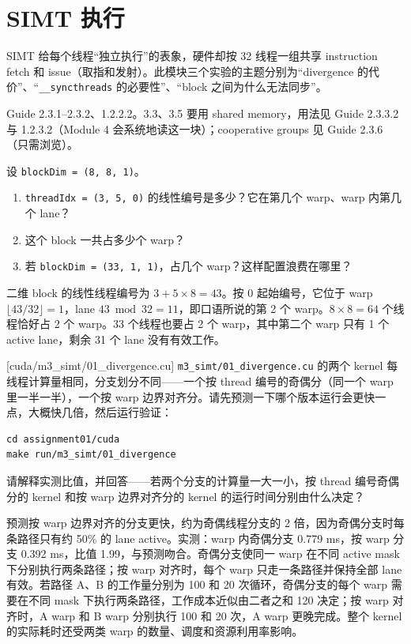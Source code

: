 \documentclass[11pt,a4paper,fontset=none]{ctexart}
\begin{document}
\section{SIMT 执行}

SIMT 给每个线程“独立执行”的表象，硬件却按 32 线程一组共享 instruction fetch 和 issue（取指和发射）。此模块三个实验的主题分别为“divergence 的代价”、“\texttt{\_\_syncthreads} 的必要性”、“block 之间为什么无法同步”。

\begin{reading}
Guide 2.3.1--2.3.2、1.2.2.2。3.3、3.5 要用 shared memory，用法见 Guide 2.3.3.2 与 1.2.3.2（Module 4 会系统地读这一块）；cooperative groups 见 Guide 2.3.6（只需浏览）。
\end{reading}

设 \texttt{blockDim = (8, 8, 1)}。
\begin{enumerate}[label=(\alph*)]
  \item \texttt{threadIdx = (3, 5, 0)} 的线性编号是多少？它在第几个 warp、warp 内第几个 lane？
  \item 这个 block 一共占多少个 warp？
  \item 若 \texttt{blockDim = (33, 1, 1)}，占几个 warp？这样配置浪费在哪里？
\end{enumerate}

\begin{tcolorbox}[title={3.1 作答（讨论后整理）}]
二维 block 的线性线程编号为 $3+5\times8=43$。按 0 起始编号，它位于 warp $\lfloor43/32\rfloor=1$，lane $43\bmod32=11$，即口语所说的第 2 个 warp。$8\times8=64$ 个线程恰好占 2 个 warp。33 个线程也要占 2 个 warp，其中第二个 warp 只有 1 个 active lane，剩余 31 个 lane 没有有效工作。
\end{tcolorbox}

[cuda/m3\_simt/01\_divergence.cu]
\texttt{m3\_simt/01\_divergence.cu} 的两个 kernel 每线程计算量相同，分支划分不同——一个按 thread 编号的奇偶分（同一个 warp 里一半一半），一个按 warp 边界对齐分。请先预测一下哪个版本运行会更快一点，大概快几倍，然后运行验证：

\begin{lstlisting}
cd assignment01/cuda
make run/m3_simt/01_divergence
\end{lstlisting}

请解释实测比值，并回答——若两个分支的计算量一大一小，按 thread 编号奇偶分的 kernel 和按 warp 边界对齐分的 kernel 的运行时间分别由什么决定？

\begin{tcolorbox}[title={3.2 实验记录（部分完成）}]
预测按 warp 边界对齐的分支更快，约为奇偶线程分支的 2 倍，因为奇偶分支时每条路径只有约 50\% 的 lane active。实测：warp 内奇偶分支 0.779 ms，按 warp 分支 0.392 ms，比值 1.99，与预测吻合。奇偶分支使同一 warp 在不同 active mask 下分别执行两条路径；按 warp 对齐时，每个 warp 只走一条路径并保持全部 lane 有效。若路径 A、B 的工作量分别为 100 和 20 次循环，奇偶分支的每个 warp 需要在不同 mask 下执行两条路径，工作成本近似由二者之和 120 决定；按 warp 对齐时，A warp 和 B warp 分别执行 100 和 20 次，A warp 更晚完成。整个 kernel 的实际耗时还受两类 warp 的数量、调度和资源利用率影响。
\end{tcolorbox}
\end{document}
